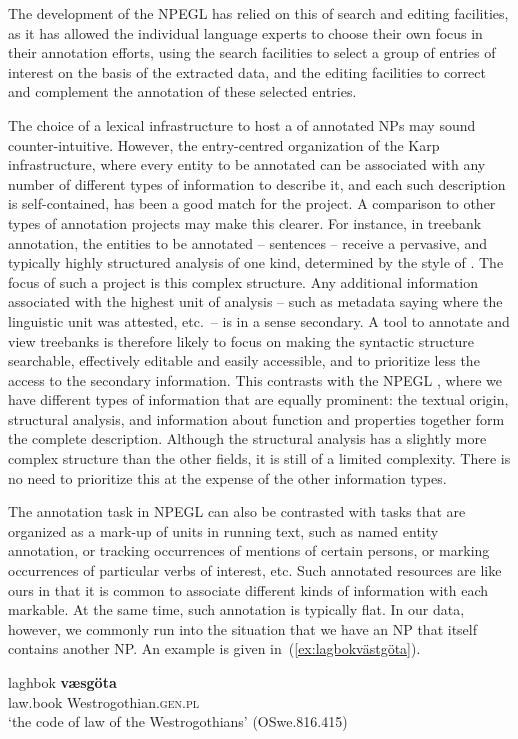 \documentclass[output=paper,colorlinks,citecolor=brown]{langscibook}
\begin{document}
The development of the NPEGL  has relied on this
 of search and editing facilities, as it has allowed the
individual language experts to choose their own focus in their
annotation efforts, using the search facilities to select a group of
entries of interest on the basis of the extracted data, and the
editing facilities to correct and complement the annotation of these
selected entries.

The choice of a lexical infrastructure to host a  of
annotated NPs may sound counter-intuitive. However, the entry-centred
organization of the Karp infrastructure, where every entity to be
annotated can be associated with any number of different types of
information to describe it, and each such description is
self-contained, has been a good match for the project. A comparison to
other types of annotation projects may make this clearer. For instance,
in treebank annotation, the entities to be annotated -- sentences --
receive a pervasive, and typically highly structured analysis of one
kind, determined by the style of . The focus of such a project
is this complex structure. Any additional information associated
with the highest unit of analysis -- such as metadata saying
where the linguistic unit was attested, etc.\ -- is in a sense secondary. A tool to annotate and view treebanks is therefore likely to focus on making the syntactic
structure searchable, effectively editable and easily accessible, and to prioritize less
the access to the secondary information. This contrasts with the NPEGL
, where we have different types of information that are equally
prominent: the textual origin, structural analysis, and 
information about function and  properties together form
the complete description. Although the structural analysis has a
slightly more complex structure than the other fields, it is still of
a limited complexity. There is no need to prioritize this at the expense
of the other information types. 

The annotation task in NPEGL can also be contrasted with tasks  that are organized as a mark-up of units in running text, such as named
entity annotation, or tracking occurrences of mentions
of certain persons, or marking occurrences of particular verbs of interest,
etc. Such annotated resources are like ours in that it is common to
associate different kinds of information with each markable. At the
same time, such annotation is typically flat. In our data, however, we
commonly run into the situation that we have an NP that itself
contains another NP. An example is given in~(\ref{ex:lagbokvästgöta}).
\begin{exe}
  \ex \label{ex:lagbokvästgöta}{\gll
    laghbok \textbf{væsgöta}\\
    law.book     Westrogothian.\textsc{gen.pl}\\
    \glt `the code of law of the Westrogothians' (OSwe.816.415)}
\end{exe}
\end{document}
